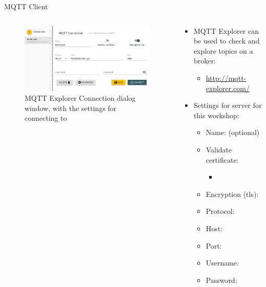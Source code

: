 \documentclass[aspectratio=169]{beamer}
\begin{document}
\begin{frame}{MQTT Client}
\begin{columns}
\begin{column}{0.6\textwidth}
		\centering
		\begin{figure}
  			\includegraphics[width=\textwidth]{assets/pictures/mqtt-explorer.png}
  			\caption{MQTT Explorer Connection dialog window, with the settings for connecting to }
  			\label{fig:mqtt-explorer}
		\end{figure}
	\end{column}
	\begin{column}{0.4\textwidth}
		\begin{textBox}
		\begin{itemize}
			\item MQTT Explorer can be used to check and explore topics on a broker:
			\begin{itemize}
				\item \small\url{http://mqtt-explorer.com/}
			\end{itemize}
			\item Settings for  server for this workshop:
			\begin{itemize}
				\item Name:  (optional)	
				\item Validate certificate:	  
				\begin{itemize}
					\item {}
				\end{itemize}
				\item Encryption (tls):	  
				\item Protocol: 
				\item Host: 
				\item Port: 
				\item Username: 
				\item Password: 
			\end{itemize}
		\end{itemize}
		\end{textBox}
	\end{column}
\end{columns}
\end{frame}
\end{document}
